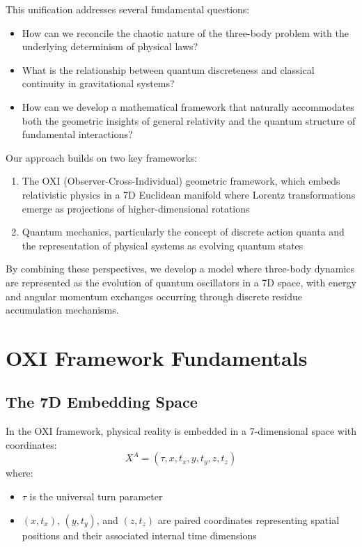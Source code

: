 \documentclass{article}
\begin{document}
This unification addresses several fundamental questions:
\begin{itemize}
\item How can we reconcile the chaotic nature of the three-body problem with the underlying determinism of physical laws?
\item What is the relationship between quantum discreteness and classical continuity in gravitational systems?
\item How can we develop a mathematical framework that naturally accommodates both the geometric insights of general relativity and the quantum structure of fundamental interactions?
\end{itemize}

Our approach builds on two key frameworks:
\begin{enumerate}
\item The OXI (Observer-Cross-Individual) geometric framework, which embeds relativistic physics in a 7D Euclidean manifold where Lorentz transformations emerge as projections of higher-dimensional rotations
\item Quantum mechanics, particularly the concept of discrete action quanta and the representation of physical systems as evolving quantum states
\end{enumerate}

By combining these perspectives, we develop a model where three-body dynamics are represented as the evolution of quantum oscillators in a 7D space, with energy and angular momentum exchanges occurring through discrete residue accumulation mechanisms.

\section{OXI Framework Fundamentals}

\subsection{The 7D Embedding Space}

In the OXI framework, physical reality is embedded in a 7-dimensional space with coordinates:
\begin{equation}
X^A = (\tau, x, t_x, y, t_y, z, t_z)
\end{equation}
where:
\begin{itemize}
\item $\tau$ is the universal turn parameter
\item $(x, t_x)$, $(y, t_y)$, and $(z, t_z)$ are paired coordinates representing spatial positions and their associated internal time dimensions
\end{itemize}
\end{document}
